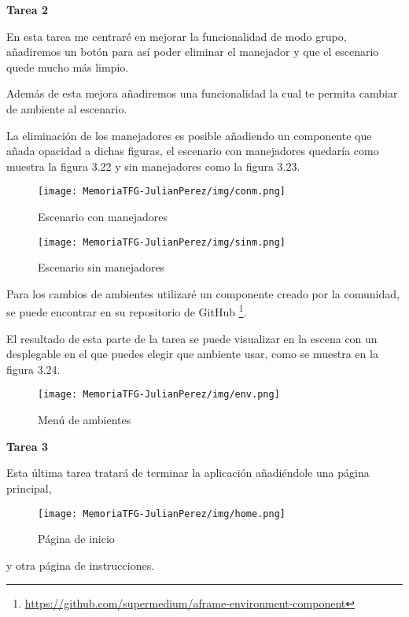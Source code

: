 \documentclass[a4paper, 12pt]{book}
\begin{document}
\textbf{Tarea 2}

En esta tarea me centraré en mejorar la funcionalidad de modo grupo, añadiremos un botón para así poder eliminar el manejador y que el escenario quede mucho más limpio.

Además de esta mejora añadiremos una funcionalidad la cual te permita cambiar de ambiente al escenario.

La eliminación de los manejadores es posible añadiendo un componente que añada opacidad a dichas figuras, el escenario con manejadores quedaría como muestra la figura 3.22 y sin manejadores como la figura 3.23.

\begin{figure}[H]
  \centering
  \begin{minipage}[b]{0.4\textwidth}
 \texttt{[image: MemoriaTFG-JulianPerez/img/conm.png]}
  \caption{Escenario con manejadores}\label{single}
  \end{minipage}
  \hfill
  \begin{minipage}[b]{0.4\textwidth}
  \texttt{[image: MemoriaTFG-JulianPerez/img/sinm.png]}
  \caption{Escenario sin manejadores}\label{scrum}
  \end{minipage}
\end{figure}

Para los cambios de ambientes utilizaré un componente creado por la comunidad, se puede encontrar en su repositorio de GitHub \footnote{\url{https://github.com/supermedium/aframe-environment-component}}. 

El resultado de esta parte de la tarea se puede visualizar en la escena con un desplegable en el que puedes elegir que ambiente usar, como se muestra en la figura 3.24.

\begin{figure}[H]
  \centering
  \texttt{[image: MemoriaTFG-JulianPerez/img/env.png]}
  \caption{Menú de ambientes}\label{menu2}
\end{figure}

\textbf{Tarea 3}

Esta última tarea tratará de terminar la aplicación añadiéndole una página principal,

\begin{figure}[H]
  \centering
  \texttt{[image: MemoriaTFG-JulianPerez/img/home.png]}
  \caption{Página de inicio}\label{home}
\end{figure}

y otra página de instrucciones.
\end{document}
